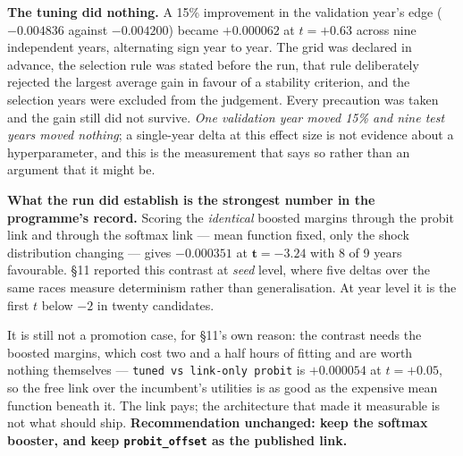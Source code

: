 \textbf{The tuning did nothing.} A 15\% improvement in the validation year's edge ($-0.004836$
against $-0.004200$) became $+0.000062$ at $t=+0.63$ across nine independent years, alternating sign
year to year. The grid was declared in advance, the selection rule was stated before the run, that
rule deliberately rejected the largest average gain in favour of a stability criterion, and the
selection years were excluded from the judgement. Every precaution was taken and the gain still did
not survive. \emph{One validation year moved 15\% and nine test years moved nothing}; a single-year
delta at this effect size is not evidence about a hyperparameter, and this is the measurement that
says so rather than an argument that it might be.

\textbf{What the run did establish is the strongest number in the programme's record.} Scoring the
\emph{identical} boosted margins through the probit link and through the softmax link --- mean
function fixed, only the shock distribution changing --- gives $-0.000351$ at $\mathbf{t=-3.24}$ with
8 of 9 years favourable. §11 reported this contrast at \emph{seed} level, where five deltas over the
same races measure determinism rather than generalisation. At year level it is the first $t$ below
$-2$ in twenty candidates.

It is still not a promotion case, for §11's own reason: the contrast needs the boosted margins, which
cost two and a half hours of fitting and are worth nothing themselves --- \texttt{tuned vs link-only
probit} is $+0.000054$ at $t=+0.05$, so the free link over the incumbent's utilities is as good as
the expensive mean function beneath it. The link pays; the architecture that made it measurable is
not what should ship. \textbf{Recommendation unchanged: keep the softmax booster, and keep
\texttt{probit\_offset} as the published link.}
